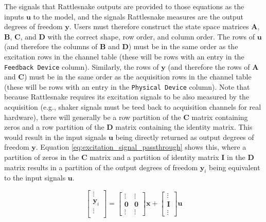 \documentclass[pdf,12pt,report]{SANDreport}
\newcommand{\inlineCode}{\lstinline[basicstyle=\bfseries\ttfamily]}
\begin{document}
{{{{{{{    The signals that Rattlesnake outputs are provided to those equations as the inputs $\mathbf{u}$ to the model, and the signals Rattlesnake measures are the output degrees of freedom $\mathbf{y}$.  Users must therefore construct the state space matrices $\mathbf{A}$, $\mathbf{B}$, $\mathbf{C}$, and $\mathbf{D}$ with the correct shape, row order, and column order.  The rows of $\mathbf{u}$ (and therefore the columns of $\mathbf{B}$ and $\mathbf{D}$) must be in the same order as the excitation rows in the channel table (these will be rows with an entry in the \inlineCode{Feedback Device} column).  Similarly, the rows of $\mathbf{y}$ (and therefore the rows of $\mathbf{A}$ and $\mathbf{C}$) must be in the same order as the acquisition rows in the channel table (these will be rows with an entry in the \inlineCode{Physical Device} column).  Note that because Rattlesnake requires its excitation signals to be also measured by the acquisition (e.g., shaker signals must be teed back to acquisition channels for real hardware), there will generally be a row partition of the $\mathbf{C}$ matrix containing zeros and a row partition of the $\mathbf{D}$ matrix containing the identity matrix.  This would result in the input signals $\mathbf{u}$ being directly returned as output degrees of freedom $\mathbf{y}$.  Equation \eqref{eq:excitation_signal_passthrough} shows this, where a partition of zeros in the $\mathbf{C}$ matrix and a partition of identity matrix $\mathbf{I}$ in the $\mathbf{D}$ matrix results in a partition of the output degrees of freedom $\mathbf{y}_i$ being equivalent to the input signals $\mathbf{u}$.
    
    \begin{equation}\label{eq:excitation_signal_passthrough}
        \begin{bmatrix}
            \vdots \\
            \mathbf{y}_{i} \\
            \vdots \\
        \end{bmatrix} = \begin{bmatrix}
            \vdots & \vdots \\
            \mathbf{0} & \mathbf{0} \\
            \vdots & \vdots
        \end{bmatrix}\mathbf{x} + 
        \begin{bmatrix}
            \vdots \\ \mathbf{I} \\ \vdots
        \end{bmatrix}\mathbf{u}
    \end{equation}
    
}}}}}}}
\end{document}
